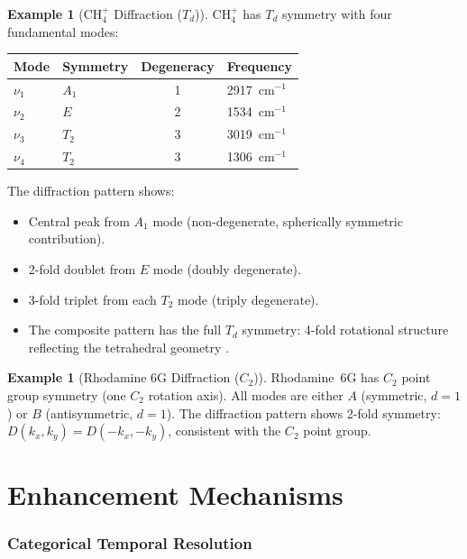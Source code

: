 \documentclass[11pt,a4paper]{article}
\theoremstyle{definition}
\newtheorem{example}[theorem]{Example}
\theoremstyle{remark}
\begin{document}
\begin{example}[CH$_4^+$ Diffraction ($T_d$)]
\label{ex:ch4_diffraction}
CH$_4^+$ has $T_d$ symmetry with four fundamental modes:
\begin{center}
\begin{tabular}{llcl}
\toprule
Mode & Symmetry & Degeneracy & Frequency \\
\midrule
$\nu_1$ & $A_1$ & 1 & 2917~cm$^{-1}$ \\
$\nu_2$ & $E$ & 2 & 1534~cm$^{-1}$ \\
$\nu_3$ & $T_2$ & 3 & 3019~cm$^{-1}$ \\
$\nu_4$ & $T_2$ & 3 & 1306~cm$^{-1}$ \\
\bottomrule
\end{tabular}
\end{center}
The diffraction pattern shows:
\begin{itemize}
  \item Central peak from $A_1$ mode (non-degenerate, spherically symmetric contribution).
  \item 2-fold doublet from $E$ mode (doubly degenerate).
  \item 3-fold triplet from each $T_2$ mode (triply degenerate).
  \item The composite pattern has the full $T_d$ symmetry: 4-fold rotational structure reflecting the tetrahedral geometry \citep{cotton1990, harris2003}.
\end{itemize}
\end{example}

\begin{example}[Rhodamine 6G Diffraction ($C_2$)]
\label{ex:rhodamine_diffraction}
Rhodamine~6G has $C_2$ point group symmetry (one $C_2$ rotation axis). All modes are either $A$ (symmetric, $d=1$) or $B$ (antisymmetric, $d=1$). The diffraction pattern shows 2-fold symmetry: $D(k_x, k_y) = D(-k_x, -k_y)$, consistent with the $C_2$ point group.
\end{example}


\part{Enhancement Mechanisms}

\section{Categorical Temporal Resolution}
\label{sec:categorical_time}
\end{document}
